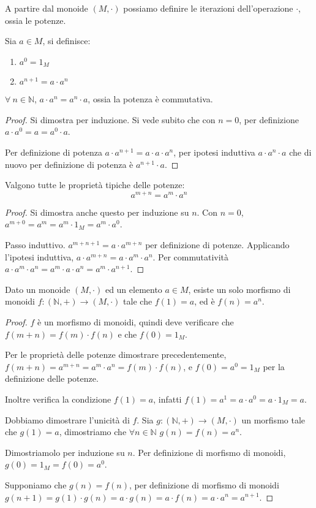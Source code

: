 \begin{defn}[Potenze]
A partire dal monoide $(M, \cdot)$ possiamo definire le iterazioni dell'operazione $\cdot$, ossia le potenze.

Sia $ a \in M$, si definisce:
\begin{enumerate}
    \item $a^0 = 1_M$
    \item $a^{n+1} = a \cdot a^{n}$
\end{enumerate}
\end{defn}
\begin{prop}
$\forall \ n \in \mathbb{N}$, $a \cdot a^n = a^n \cdot a$, ossia la potenza \`e commutativa.
\end{prop}
\begin{proof}
Si dimostra per induzione. Si vede subito che con $n = 0$, per definizione $a \cdot a^0 = a = a^0 \cdot a$.

Per definizione di potenza $a \cdot a^{n+1} = a \cdot a \cdot a^{n} $, per ipotesi induttiva $ a \cdot a^n \cdot a $ che di nuovo per definizione di potenza \`e $ a^{n+1} \cdot a$.
\end{proof}
\begin{prop}
Valgono tutte le propriet\`a tipiche delle potenze:
\[
a^{m + n} = a^m \cdot a^n
\]
\end{prop}
\begin{proof}
Si dimostra anche questo per induzione su $n$. Con $n = 0$, $a^{m+0} = a^m = a^m \cdot 1_M = a^m \cdot a^0$.

Passo induttivo. $a^{m + n + 1} = a \cdot a^{m + n}$ per definizione di potenze. Applicando l'ipotesi induttiva, $a \cdot a^{m + n} = a \cdot a^m \cdot a^n$. Per commutativit\`a $a \cdot a^m \cdot a^n = a^m \cdot a \cdot a^n = a^m \cdot a^{n+1}$.
\end{proof}

\begin{theorem}
Dato un monoide $(M, \cdot)$ ed un elemento $a \in M$, esiste un solo morfismo di monoidi $f : (\mathbb{N}, +) \to (M, \cdot)$ tale che $f(1) = a$, ed \`e $f(n) = a^n$.
\end{theorem}
\begin{proof}
$f$ \`e un morfismo di monoidi, quindi deve verificare che $f(m+n) = f(m) \cdot f(n)$ e che $f(0) = 1_M$. 

Per le propriet\`a delle potenze dimostrare precedentemente, $f(m+ n) = a^{m+n} = a^m \cdot a^n = f(m) \cdot f(n)$, e $f(0) = a^0 = 1_M$ per la definizione delle potenze. 

Inoltre verifica la condizione $f(1) = a$, infatti $f(1) = a^1 = a \cdot a^0 = a \cdot 1_M = a$.

Dobbiamo dimostrare l'unicit\`a di $f$. Sia $g : (\mathbb{N}, +) \to (M, \cdot )$ un morfismo tale che $g(1) = a$, dimostriamo che $\forall n \in \mathbb{N} $ $ g(n) = f(n) = a^n$.

Dimostriamolo per induzione su $n$. Per definizione di morfismo di monoidi, $g(0) = 1_M = f(0) = a^0$.

Supponiamo che $g(n) = f(n)$, per definizione di morfismo di monoidi $g(n+1) = g(1) \cdot g(n) = a \cdot g(n) = a \cdot f(n) = a \cdot a^n = a^{n+1}$.
\end{proof}

